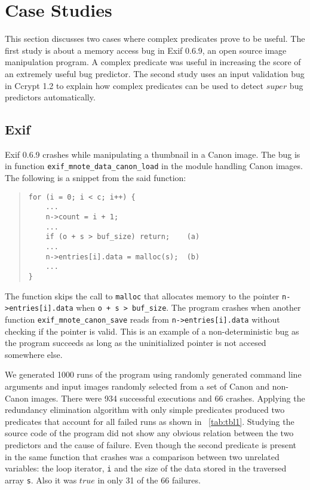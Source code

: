 \section{Case Studies}
\label{sec-qual}
This section discusses two cases where complex predicates prove to be useful.  The first study is about a memory access bug in Exif 0.6.9, an open source image manipulation program.  A complex predicate was useful in increasing the score of an extremely useful bug predictor.  The second study uses an input validation bug in Ccrypt 1.2 to explain how complex predicates can be used to detect $super$ bug predictors automatically.

\subsection{Exif}
Exif 0.6.9 crashes while manipulating a thumbnail in a Canon image.  The bug is in function \texttt{exif\_mnote\_data\_canon\_load} in the module handling Canon images.  The following is a snippet from the said function:
\begin{quote}
\begin{verbatim}
for (i = 0; i < c; i++) {
    ...
    n->count = i + 1;
    ...
    if (o + s > buf_size) return;    (a)
    ...
    n->entries[i].data = malloc(s);  (b)
    ...
}
\end{verbatim}
\end{quote}

The function skips the call to \texttt{malloc} that allocates memory to the pointer \texttt{n->entries[i].data} when \texttt{o + s > buf\_size}.  The program crashes when another function \texttt{exif\_\-mnote\_\-canon\_save} reads from \texttt{n->entries[i].data} without checking if the pointer is valid.  This is an example of a non-deterministic bug as the program succeeds as long as the uninitialized pointer is not accesed somewhere else.

We generated 1000 runs of the program using randomly generated command line arguments and input images randomly selected from a set of Canon and non-Canon images.  There were 934 successful executions and 66 crashes.  Applying the redundancy elimination algorithm with only simple predicates produced two predicates that account for all failed runs as shown in ~\autoref{tab:tbl1}.  Studying the source code of the program did not show any obvious relation between the two predictors and the cause of failure.  Even though the second predicate is present in the same function that crashes was a comparison between two unrelated variables: the loop iterator, \texttt{i} and the size of the data stored in the traversed array \texttt{s}.  Also it was $true$ in only 31 of the 66 failures.

